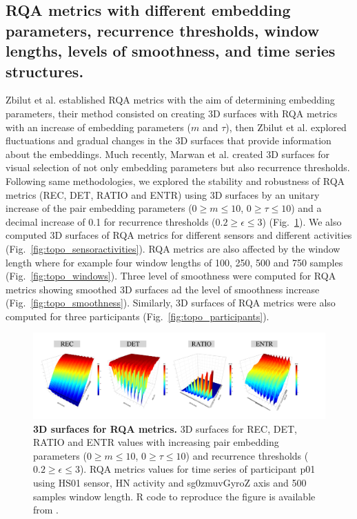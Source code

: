 \subsection{RQA metrics with different embedding parameters, recurrence thresholds, 
window lengths, levels of smoothness, and time series structures.}
Zbilut et al. \cite{zbilut1992} established RQA metrics with the aim of determining 
embedding parameters, their method consisted on creating 3D surfaces with RQA metrics 
with an increase of embedding parameters ($m$ and $\tau$), then 
Zbilut et al. \cite{zbilut1992} explored fluctuations and gradual changes in the 3D surfaces
that provide information about the embeddings.
Much recently, Marwan et al. \cite{marwan2015} created 3D surfaces for visual selection 
of not only embedding parameters but also recurrence thresholds. 
Following same methodologies, we explored the stability and robustness of RQA metrics (REC, DET, RATIO and ENTR)
using 3D surfaces by an unitary increase of the pair embedding parameters ($0 \ge m \le 10$, $0 \ge \tau \le 10$) 
and a decimal increase of 0.1 for recurrence thresholds ($ 0.2 \ge \epsilon \le 3 $) (Fig.~\ref{fig:topo_rqas}).
We also computed 3D surfaces of RQA metrics for different sensors and different activities (Fig.~\ref{fig:topo_sensoractivities}).
RQA metrics are also affected by the window length where for example four 
window lengths of 100, 250, 500 and 750 samples (Fig.~\ref{fig:topo_windows}).
Three level of smoothness were computed for RQA metrics showing 
smoothed 3D surfaces ad the level of smoothness increase (Fig.~\ref{fig:topo_smoothness}).
Similarly, 3D surfaces of RQA metrics were also computed for three participants (Fig.~\ref{fig:topo_participants}).
\begin{figure}[!ht]
\centering
\includegraphics[width=1.0\textwidth]{rqas}
    \caption{
	{\bf 3D surfaces for RQA metrics.}
	3D surfaces for REC, DET, RATIO and ENTR values with increasing 
	pair embedding parameters ($0 \ge m \le 10$, $0 \ge \tau \le 10$) 
	and recurrence thresholds (  $ 0.2 \ge \epsilon \le 3 $).
	RQA metrics values for time series of participant p01 using HS01 sensor, 
	HN activity and sg0zmuvGyroZ axis and 500 samples window length.
        R code to reproduce the figure is available from \cite{hwum2018}.
	}
\label{fig:topo_rqas}
\end{figure}
